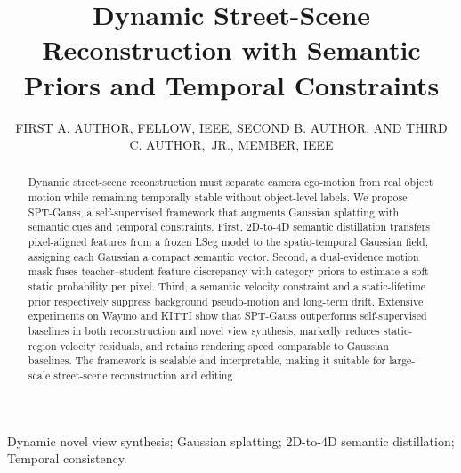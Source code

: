 \documentclass{IEEEoj}
\begin{document}

\title{Dynamic Street-Scene Reconstruction with Semantic Priors and Temporal Constraints}

\author{FIRST A. AUTHOR, FELLOW, IEEE, SECOND B.
AUTHOR, AND THIRD C. AUTHOR,~JR.,
MEMBER, IEEE}

\begin{abstract}
Dynamic street-scene reconstruction must separate camera ego-motion from real object motion while remaining temporally stable without object-level labels. 
We propose SPT-Gauss, a self-supervised framework that augments Gaussian splatting with semantic cues and temporal constraints. 
First, 2D-to-4D semantic distillation transfers pixel-aligned features from a frozen LSeg model to the spatio-temporal Gaussian field, assigning each Gaussian a compact semantic vector. 
Second, a dual-evidence motion mask fuses teacher–student feature discrepancy with category priors to estimate a soft static probability per pixel. 
Third, a semantic velocity constraint and a static-lifetime prior respectively suppress background pseudo-motion and long-term drift. 
Extensive experiments on Waymo and KITTI show that SPT-Gauss outperforms self-supervised baselines in both reconstruction and novel view synthesis, markedly reduces static-region velocity residuals, and retains rendering speed comparable to Gaussian baselines. 
The framework is scalable and interpretable, making it suitable for large-scale street-scene reconstruction and editing.
\end{abstract}

\begin{IEEEkeywords}
Dynamic novel view synthesis; Gaussian splatting; 2D-to-4D semantic distillation; Temporal consistency.
\end{IEEEkeywords}

\end{document}
